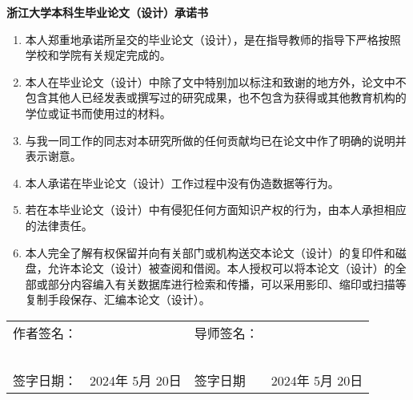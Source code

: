 
\begin{center}
    \bfseries {} 浙江大学本科生毕业论文（设计）承诺书
\end{center}

{

\begin{enumerate}[itemindent=44pt, leftmargin=0pt, itemsep=0pt, parsep=0pt, topsep = 0pt]
    \item 本人郑重地承诺所呈交的毕业论文（设计），是在指导教师的指导下严格按照学校和学院有关规定完成的。
    \item 本人在毕业论文（设计）中除了文中特别加以标注和致谢的地方外，论文中不包含其他人已经发表或撰写过的研究成果，也不包含为获得或其他教育机构的学位或证书而使用过的材料。
    \item 与我一同工作的同志对本研究所做的任何贡献均已在论文中作了明确的说明并表示谢意。
    \item 本人承诺在毕业论文（设计）工作过程中没有伪造数据等行为。
    \item 若在本毕业论文（设计）中有侵犯任何方面知识产权的行为，由本人承担相应的法律责任。
    \item 本人完全了解有权保留并向有关部门或机构送交本论文（设计）的复印件和磁盘，允许本论文（设计）被查阅和借阅。本人授权可以将本论文（设计）的全部或部分内容编入有关数据库进行检索和传播，可以采用影印、缩印或扫描等复制手段保存、汇编本论文（设计）。
\end{enumerate}

\mbox{} \vfill

\begin{center}
    \begin{tabularx}{\linewidth}{>{\fangsong}X>{\fangsong}X>{\fangsong}X>{\fangsong}X}
        作者签名： & ~                           & 导师签名： & ~                           \\
        ~          & ~                           & ~          & ~                           \\
        签字日期： & 2024年 \quad 5月 \quad 20日 & 签字日期   & 2024年 \quad 5月 \quad 20日 \\
    \end{tabularx}
\end{center}
}
